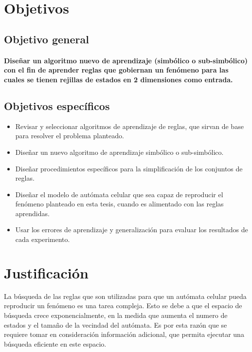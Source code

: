 \section{Objetivos}
%
\subsection{Objetivo general}
\noindent \paragraph{Diseñar un algoritmo nuevo de aprendizaje (simbólico o sub-simbólico) con el fin de aprender reglas que gobiernan un fenómeno para las cuales se tienen rejillas de estados en 2 dimensiones como entrada.}

\subsection{Objetivos específicos}
\begin{itemize}
\item Revisar y seleccionar algoritmos de aprendizaje de reglas, que sirvan de base para resolver el problema planteado.
\item Diseñar un nuevo algoritmo de aprendizaje simbólico o sub-simbólico.
\item Diseñar procedimientos específicos para la simplificación de los conjuntos de reglas.
\item Diseñar el modelo de autómata celular que sea capaz de reproducir el fenómeno planteado en esta tesis, cuando es alimentado con las reglas aprendidas.
\item Usar los errores de aprendizaje y generalización para evaluar los resultados de cada experimento. 
\end{itemize}

\section{Justificación}
La búsqueda de las reglas que son utilizadas para que un autómata celular pueda reproducir un fenómeno es una tarea compleja. Esto se debe a que el espacio de búsqueda crece exponencialmente, en la medida que aumenta el
numero de estados y el tamaño de la vecindad del autómata. Es por esta razón que se requiere tomar en consideración información adicional, que permita ejecutar una búsqueda eficiente en este espacio.

